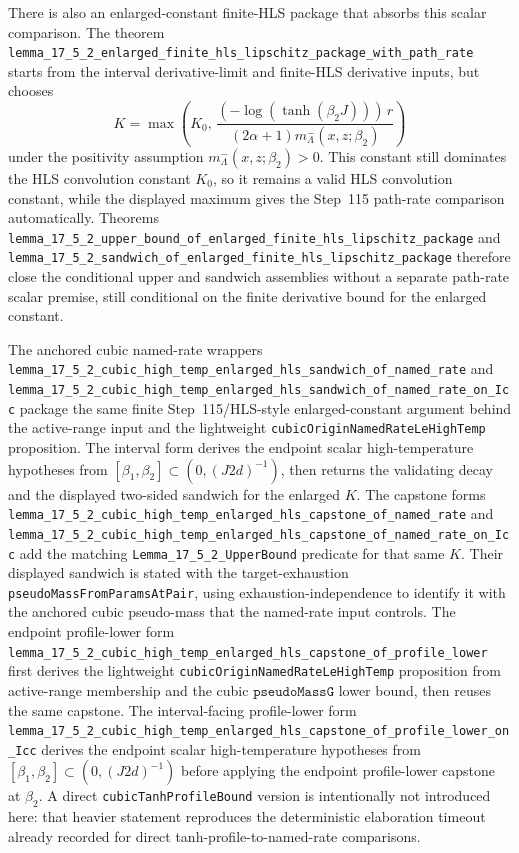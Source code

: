\documentclass[a4paper,11pt]{article}
\begin{document}
There is also an enlarged-constant finite-HLS package that absorbs this scalar
comparison.  The theorem
\texttt{lemma\_17\_5\_2\_enlarged\_finite\_hls\_lipschitz\_package\_with\_path\_rate}
starts from the interval derivative-limit and finite-HLS derivative inputs, but
chooses
\[
  K=\max\!\left(K_0,\,
      \frac{(-\log(\tanh(\beta_2J)))\,r}{(2\alpha+1)m^-_{\Lambda}(x,z;\beta_2)}
    \right)
\]
under the positivity assumption \(m^-_{\Lambda}(x,z;\beta_2)>0\).  This
constant still dominates the HLS convolution constant \(K_0\), so it remains a
valid HLS convolution constant, while the displayed maximum gives the Step~115
path-rate comparison automatically.  Theorems
\texttt{lemma\_17\_5\_2\_upper\_bound\_of\_enlarged\_finite\_hls\_lipschitz\_package}
and
\texttt{lemma\_17\_5\_2\_sandwich\_of\_enlarged\_finite\_hls\_lipschitz\_package}
therefore close the conditional upper and sandwich assemblies without a
separate path-rate scalar premise, still conditional on the finite derivative
bound for the enlarged constant.

The anchored cubic named-rate wrappers
\texttt{lemma\_17\_5\_2\_cubic\_high\_temp\_enlarged\_hls\_sandwich\_of\_named\_rate}
and
\texttt{lemma\_17\_5\_2\_cubic\_high\_temp\_enlarged\_hls\_sandwich\_of\_named\_rate\_on\_Icc}
package the same finite Step~115/HLS-style enlarged-constant argument behind
the active-range input and the lightweight
\texttt{cubicOriginNamedRateLeHighTemp} proposition.  The interval form derives
the endpoint scalar high-temperature hypotheses from
\(\left[\beta_1,\beta_2\right]\subset (0,(J2d)^{-1})\), then returns the
validating decay and the displayed two-sided sandwich for the enlarged \(K\).
The capstone forms
\texttt{lemma\_17\_5\_2\_cubic\_high\_temp\_enlarged\_hls\_capstone\_of\_named\_rate}
and
\texttt{lemma\_17\_5\_2\_cubic\_high\_temp\_enlarged\_hls\_capstone\_of\_named\_rate\_on\_Icc}
add the matching \texttt{Lemma\_17\_5\_2\_UpperBound} predicate for that same
\(K\).  Their displayed sandwich is stated with the target-exhaustion
\texttt{pseudoMassFromParamsAtPair}, using exhaustion-independence to identify
it with the anchored cubic pseudo-mass that the named-rate input controls.
The endpoint profile-lower form
\texttt{lemma\_17\_5\_2\_cubic\_high\_temp\_enlarged\_hls\_capstone\_of\_profile\_lower}
first derives the lightweight \texttt{cubicOriginNamedRateLeHighTemp}
proposition from active-range membership and the cubic \(\texttt{pseudoMassG}\)
lower bound, then reuses the same capstone.  The interval-facing profile-lower
form
\texttt{lemma\_17\_5\_2\_cubic\_high\_temp\_enlarged\_hls\_capstone\_of\_profile\_lower\_on\_Icc}
derives the endpoint scalar high-temperature hypotheses from
\([\beta_1,\beta_2]\subset (0,(J2d)^{-1})\) before applying the endpoint
profile-lower capstone at \(\beta_2\).  A direct
\texttt{cubicTanhProfileBound} version is intentionally not introduced here:
that heavier statement reproduces the deterministic elaboration timeout already
recorded for direct tanh-profile-to-named-rate comparisons.
\end{document}
